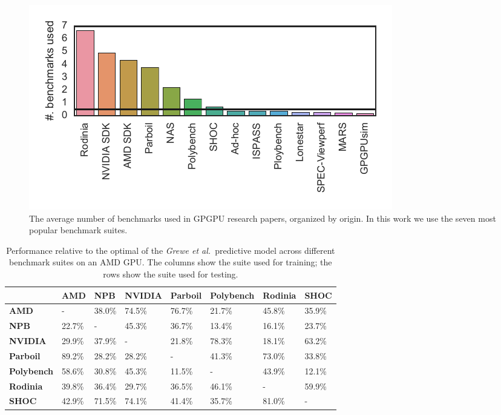 
\begin{figure}[t]
  \includegraphics[width=\columnwidth]{img/motivation-c} %
  \caption{%
    The average number of benchmarks used in GPGPU research papers, organized by
    origin. In this work we use the seven most popular benchmark suites.%
  }%
  \label{fig:benchmark-suite-distribution}
\end{figure}

\begin{table}
  \scriptsize%
  \centering%
  \begin{tabular}{ R{1.5cm} C{1.5cm} C{1.5cm} C{1.5cm} C{1.5cm} C{1.5cm} C{1.5cm} C{1.5cm} }
    \toprule
    & \textbf{AMD} & \textbf{NPB} & \textbf{NVIDIA} & \textbf{Parboil} & \textbf{Polybench} & \textbf{Rodinia} & \textbf{SHOC}\\
    \midrule
    \textbf{AMD} & - & 38.0\% & 74.5\% & 76.7\% & 21.7\% & 45.8\% & 35.9\%\\
    \textbf{NPB} & 22.7\% & - & 45.3\% & 36.7\% & 13.4\% & 16.1\% & 23.7\%\\
    \textbf{NVIDIA} & 29.9\% & 37.9\% & - & 21.8\% & 78.3\% & 18.1\% & 63.2\%\\
    \textbf{Parboil} & 89.2\% & 28.2\% & 28.2\% & - & 41.3\% & 73.0\% & 33.8\%\\
    \textbf{Polybench} & 58.6\% & 30.8\% & 45.3\% & 11.5\% & - & 43.9\% & 12.1\%\\
  \textbf{Rodinia} & 39.8\% & 36.4\% & 29.7\% & 36.5\% & 46.1\% & - & 59.9\%\\
  \textbf{SHOC} & 42.9\% & 71.5\% & 74.1\% & 41.4\% & 35.7\% & 81.0\% & -\\
  \end{tabular}
  \caption{Performance relative to the optimal of the \emph{Grewe et al.\ }predictive model across different benchmark suites on an AMD GPU. The columns show the suite used for training; the rows show the suite used for testing.}%
  \label{tab:benchmark-xval}
\end{table}

